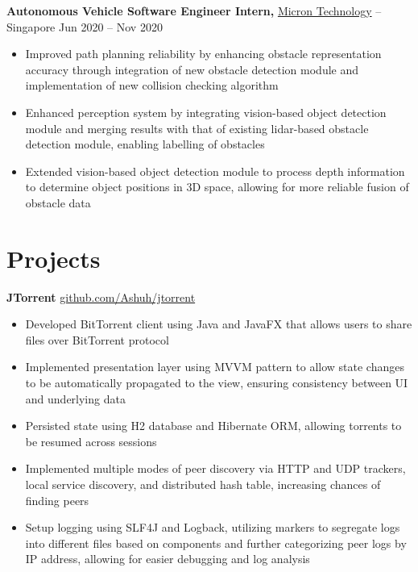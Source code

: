 \documentclass[11pt]{article}       %
\begin{document}
\textbf{Autonomous Vehicle Software Engineer Intern,} \href{https://www.micron.com/}{Micron Technology} -- Singapore \hfill Jun 2020 -- Nov 2020 \\
\vspace{-9pt}
\begin{itemize}
  \item Improved path planning reliability by enhancing obstacle representation accuracy through integration of new obstacle detection module and implementation of new collision checking algorithm
  \item Enhanced perception system by integrating vision-based object detection module and merging results with that of existing lidar-based obstacle detection module, enabling labelling of obstacles
  \item Extended vision-based object detection module to process depth information to determine object positions in 3D space, allowing for more reliable fusion of obstacle data
\end{itemize}

\vspace{-18.5pt}

\section*{Projects}
\textbf{JTorrent} \hfill \href{https://github.com/Ashuh/jtorrent}{github.com/Ashuh/jtorrent} \\
\vspace{-9pt}
\begin{itemize}
  \item Developed BitTorrent client using Java and JavaFX that allows users to share files over BitTorrent protocol
  \item Implemented presentation layer using MVVM pattern to allow state changes to be automatically propagated to the view, ensuring consistency between UI and underlying data
  \item Persisted state using H2 database and Hibernate ORM, allowing torrents to be resumed across sessions
  \item Implemented multiple modes of peer discovery via HTTP and UDP trackers, local service discovery, and distributed hash table, increasing chances of finding peers
  \item Setup logging using SLF4J and Logback, utilizing markers to segregate logs into different files based on components and further categorizing peer logs by IP address, allowing for easier debugging and log analysis
\end{itemize}
\end{document}
